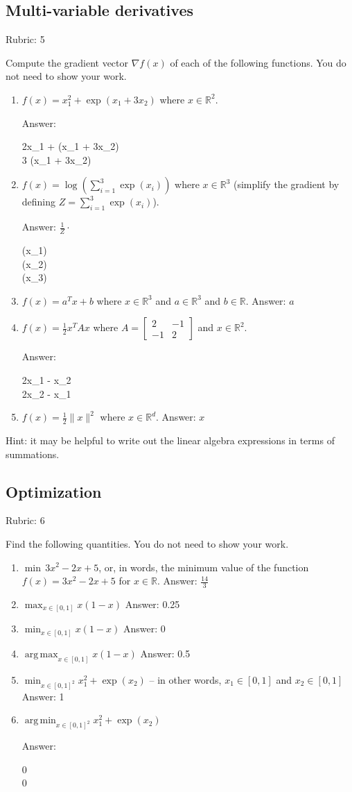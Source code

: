 \documentclass{article}
\newcommand{\ans}[1]{\green{Answer: #1}}
\newcommand{\rubric}[1]{\green{Rubric: #1}}
\newcommand{\blue}[1]{{\color{blue}#1}}
\newcommand{\green}[1]{{\color{green}#1}}
\newcommand{\norm}[1]{\|#1\|}
\newcommand{\R}{\mathbb{R}}
\DeclareMathOperator*\argmax{arg\,max}
\DeclareMathOperator*\argmin{arg\,min}
\newcommand{\mat}[1]{\begin{bmatrix}#1\end{bmatrix}}
\newcommand{\half}{\frac{1}{2}}
\begin{document}
    \subsection{Multi-variable derivatives}
    \rubric{5}

    \blue{Compute the gradient vector $\nabla f(x)$ of each of the following functions.} You do not need to show your work.
    \begin{enumerate}
        \item $f(x) = x_1^2 + \exp(x_1 + 3x_2)$ where $x \in \R^2$.
            \ans{\mat{2x_1 + \exp(x_1 + 3x_2)\\ 3 \exp(x_1 + 3x_2)}}
        \item $f(x) = \log\left(\sum_{i=1}^3\exp(x_i)\right)$ where $x \in \R^3$ (simplify the gradient by defining $Z = \sum_{i=1}^3\exp(x_i)$).
            \ans{$\frac{1}{Z}\cdot$\mat{\exp(x_1)\\ \exp(x_2)\\ \exp(x_3)}}
        \item $f(x) = a^T x + b$ where $x \in \R^3$ and $a \in \R^3$ and $b \in \R$. \ans{$a$}
        \item $f(x) = \half x^T A x$ where $A=\left[ \begin{array}{cc}
            2 & -1 \\
            -1 & 2 \end{array} \right]$ and $x \in \mathbb{R}^2$.
            \ans{\mat{2x_1 - x_2\\ 2x_2 - x_1}}
        \item $f(x) = \frac{1}{2}\norm{x}^2$ where $x \in \R^d$. \ans{$x$}
    \end{enumerate}

    Hint: it may be helpful to write out the linear algebra expressions in terms of summations.


    \subsection{Optimization}
    \rubric{6}

    \blue{Find the following quantities.} You do not need to show your work.

    \begin{enumerate}
        \item $\min \, 3x^2-2x+5$, or, in words, the minimum value of the function $f(x) = 3x^2 -2x + 5$ for $x \in \R$. \ans{$\frac{14}{3}$}

        \item $\max_{x \in [0, 1]} x(1-x)$ \ans{0.25}
        \item $\min_{x \in [0, 1]} x(1-x)$ \ans{0}
        \item $\argmax_{x \in [0, 1]} x(1-x)$ \ans{0.5}
        \item $\min_{x \in [0, 1]^2} x_1^2 + \exp(x_2)$ -- in other words, $x_1\in [0,1]$ and $x_2\in [0,1]$ \ans{1}
        \item $\argmin_{x \in [0, 1]^2} x_1^2 + \exp(x_2)$ \ans{\mat{0\\0}}
    \end{enumerate}
\end{document}
